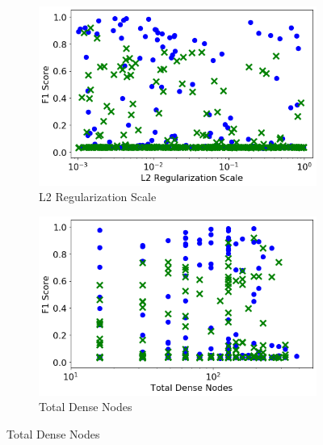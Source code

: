 \begin{figure}[H]
    \begin{subfigure}[b]{0.49\textwidth}
         \centering
         \includegraphics[width=\textwidth]{images/cnn_l2_reg.png}
         \caption{L2 Regularization Scale}
         \label{fig:cnn_l2_reg}
     \end{subfigure}
     \hfill
     \begin{subfigure}[b]{0.49\textwidth}
         \centering
         \includegraphics[width=\textwidth]{images/cnn_dense_nodes_total.png}
         \caption{Total Dense Nodes}
         \label{fig:cnn_dense_nodes_total}
     \end{subfigure}  
     

\end{figure}
